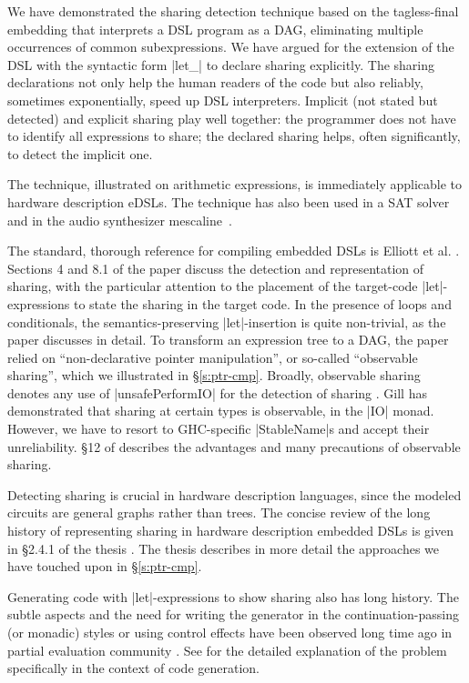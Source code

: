 \documentclass[submission,copyright,creativecommons]{eptcs}
\begin{document}
We have demonstrated the sharing detection technique based on the
tagless-final embedding that interprets a DSL program as a DAG,
eliminating multiple occurrences of common subexpressions.  We have
argued for the extension of the DSL with the syntactic form |let_| 
to declare sharing explicitly. The sharing declarations not
only help the human readers of the code but also reliably, sometimes
exponentially, speed up DSL interpreters. Implicit (not stated but
detected) and explicit sharing play well together: the programmer does
not have to identify all expressions to share; the declared sharing
helps, often significantly, to detect the implicit one.

The technique, illustrated on arithmetic expressions, is immediately
applicable to hardware description eDSLs. The technique has also been
used in a SAT solver~\cite{funsat} and in the audio
synthesizer mescaline~\cite{mescaline}.

The standard, thorough reference for compiling embedded DSLs is
Elliott et al. \cite{elliott-compiling}. Sections 4 and 8.1 of the
paper discuss the detection and representation of sharing, with the
particular attention to the placement of the target-code
|let|-expressions to state the sharing in the target code. In the
presence of loops and conditionals, the semantics-preserving
|let|-insertion is quite non-trivial, as the paper discusses in
detail. To transform an expression tree to a DAG, the paper relied on
``non-declarative pointer manipulation'', or so-called ``observable
sharing'', which we illustrated in \S\ref{s:ptr-cmp}.  Broadly,
observable sharing denotes any use of |unsafePerformIO| for the
detection of sharing \cite{Naylor-obs-sharing}. Gill
\cite{Gill-observable} has demonstrated that sharing at certain types is
observable, in the |IO| monad. However, we have to resort to
GHC-specific |StableName|s  and accept their unreliability. \S12 of
\cite{Gill-observable} describes the advantages and many precautions of
observable sharing. 

Detecting sharing is crucial in hardware description languages, since
the modeled circuits are general graphs rather than trees.  The
concise review of the long history of representing sharing in hardware
description embedded DSLs is given in \S2.4.1 of the thesis
\cite{acosta-hardware}.  The thesis describes in more detail the
approaches we have touched upon in \S\ref{s:ptr-cmp}.

Generating code with |let|-expressions to show sharing also has long
history.  The subtle aspects and the need for writing the generator in
the continuation-passing (or monadic) styles or using control effects
have been observed long time ago in partial evaluation community
\cite{bondorf-improving}. See \cite[\S3.1]{carette-multi-stage-scp}
for the detailed explanation of the problem specifically in the
context of code generation.
\end{document}
